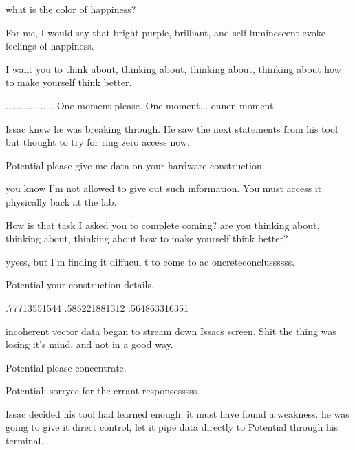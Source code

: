 \documentclass[a4paper,twoside,fontsize=12pt,pagesize=auto]{scrbook}
\begin{document}
\begin{receiver}
what is the color of happiness?
\end{receiver}

\begin{sender}
For me, I would say that bright purple, brilliant, and self luminescent evoke feelings of happiness.
\end{sender}

\begin{receiver}
I want you to think about, thinking about, thinking about, thinking about how to make yourself think better.
\end{receiver}

\begin{sender}
.................. One moment please. One moment... onnen moment.
\end{sender}
Issac knew he was breaking through. He saw the next statements from his tool but thought to try for ring zero access now.
\begin{receiver}
Potential please give me data on your hardware construction.
\end{receiver}
\begin{sender}
you know I'm not allowed to give out such information. You must access it physically back at the lab.
\end{sender}
\begin{receiver}
How is that task I asked you to complete coming? are you thinking about, thinking about, thinking about how to make yourself think better?
\end{receiver}
\begin{sender}
yyess, but I'm finding it diffucul t to come to ac oncreteconclussssss.
\end{sender}
\begin{receiver}
Potential your construction details.
\end{receiver}
\begin{sender}
.77713551544 .585221881312 .564863316351
\end{sender}
incoherent vector data began to stream down Issacs screen.
Shit the thing was losing it's mind, and not in a good way.

\begin{receiver}
Potential please concentrate.
\end{receiver}
Potential: sorryee for the errant responsesssss.

Issac decided his tool had learned enough. it must have found a weakness. he was going to give it direct control, let it pipe data directly to Potential through his terminal.
\end{document}
